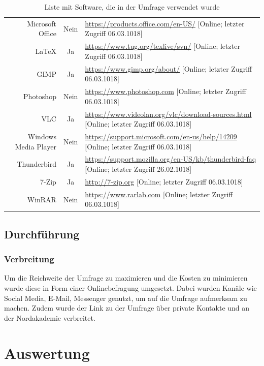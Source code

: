 \documentclass[a4paper]{article}
\begin{document}
\begin{table}[!htbp]
\begin{tabularx}{\textwidth}{rcX}
			               Microsoft Office & Nein & \tiny\url{https://products.office.com/en-US/} [Online; letzter Zugriff 06.03.1018]\\
			               LaTeX & Ja & \tiny\url{https://www.tug.org/texlive/svn/} [Online; letzter Zugriff 06.03.1018] \\
			               GIMP & Ja & \tiny\url{https://www.gimp.org/about/} [Online; letzter Zugriff 06.03.1018]\\
			               Photoshop & Nein & \tiny\url{https://www.photoshop.com} [Online; letzter Zugriff 06.03.1018]\\
			               VLC & Ja & \tiny\url{https://www.videolan.org/vlc/download-sources.html} [Online; letzter Zugriff 06.03.1018]\\
			               Windows Media Player & Nein & \tiny\url{https://support.microsoft.com/en-us/help/14209} [Online; letzter Zugriff 06.03.1018]\\
			               Thunderbird & Ja & \tiny\url{https://support.mozilla.org/en-US/kb/thunderbird-faq} [Online; letzter Zugriff 26.02.1018] \\
			               7-Zip & Ja & \tiny\url{http://7-zip.org} [Online; letzter Zugriff 06.03.1018]\\
			               WinRAR & Nein & \tiny\url{https://www.rarlab.com} [Online; letzter Zugriff 06.03.1018]
			         \end{tabularx}
			         \caption{Liste mit Software, die in der Umfrage verwendet wurde}
			         \label{table:oss}
			     \end{table}
			     
		\subsection{Durchführung}
            \subsubsection{Verbreitung}
                Um die Reichweite der Umfrage zu maximieren und die Kosten zu minimieren wurde diese in Form einer Onlinebefragung umgesetzt. Dabei wurden Kanäle wie Social Media, E-Mail, Messenger genutzt, um auf die Umfrage aufmerksam zu machen. Zudem wurde der Link zu der Umfrage über private Kontakte und an der Nordakademie verbreitet.
                
    \section{Auswertung}
\end{document}
